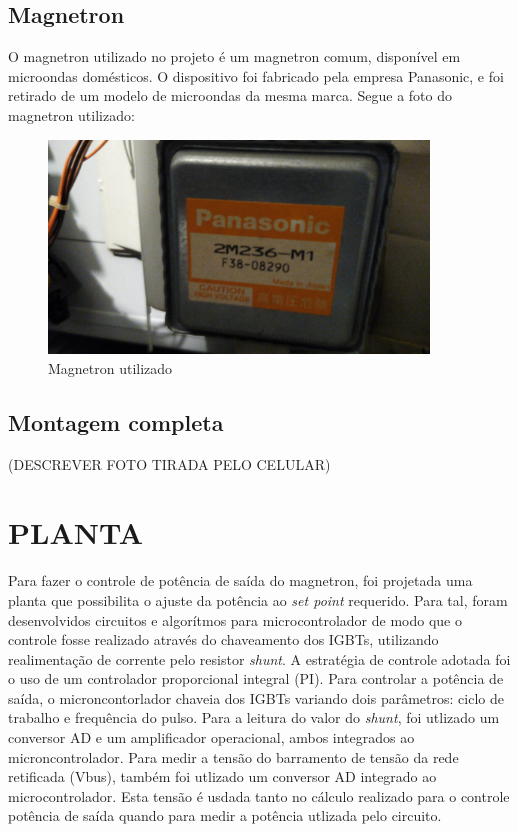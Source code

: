 \subsection{Magnetron}
O magnetron utilizado no projeto é um magnetron comum, disponível em microondas domésticos. O dispositivo foi fabricado pela empresa Panasonic, e foi retirado de um modelo de microondas da mesma marca. Segue a foto do magnetron utilizado:

\begin{figure}[H]
    \centering
    \includegraphics[width=0.9\textwidth]{./dados/figuras/magnetron-usado}
    \caption{Magnetron utilizado}
    \label{fig:figura-magnetron-usado}
\end{figure}

\subsection{Montagem completa}
(DESCREVER FOTO TIRADA PELO CELULAR)

\section{PLANTA}
Para fazer o controle de potência de saída do magnetron, foi projetada uma planta que possibilita o ajuste da potência ao \textit{set point} requerido. Para tal, foram desenvolvidos circuitos e algorítmos para microcontrolador de modo que o controle fosse realizado através do chaveamento dos IGBTs, utilizando realimentação de corrente pelo resistor \textit{shunt}. A estratégia de controle adotada foi o uso de um controlador proporcional integral (PI). Para controlar a potência de saída, o microncontorlador chaveia dos IGBTs variando dois parâmetros: ciclo de trabalho e frequência do pulso. Para a leitura do valor do \textit{shunt}, foi utlizado um conversor AD e um amplificador operacional, ambos integrados ao microncontrolador. Para medir a tensão do barramento de tensão da rede retificada (Vbus), também foi utlizado um conversor AD integrado ao microcontrolador. Esta tensão é usdada tanto no cálculo realizado para o controle potência de saída quando para medir a potência utlizada pelo circuito.


